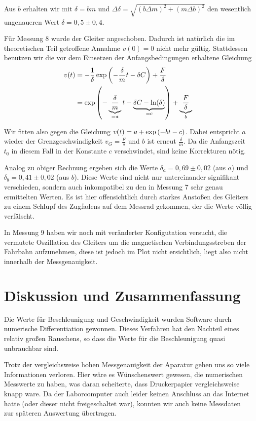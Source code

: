 \documentclass[a4paper,german,12pt,smallheadings]{scrartcl}
\begin{document}
Aus $b$ erhalten wir mit $\delta = b m$ und $\Delta \delta = \sqrt{(b \Delta
m)^2 + (m \Delta b)^2}$ den wesentlich ungenaueren Wert $\delta =
0{,}5\pm0{,}4$.

Für Messung 8 wurde der Gleiter angeschoben. Dadurch ist natürlich die im
theoretischen Teil getroffene Annahme $v(0) = 0$ nicht mehr gültig. Stattdessen
benutzen wir die vor dem Einsetzen der Anfangsbedingungen erhaltene Gleichung
\begin{align*}
  v(t) &= -\frac{1}{\delta} \exp \del{ - \frac{\delta}{m} t - \delta C} + \frac{F}{\delta} \\
       &= \exp \del{ - \underbrace{\frac{\delta}{m}}_{=a} t - \underbrace{\delta C - \ln(\delta)}_{=c}} + \underbrace{\frac{F}{\delta}}_{b} \\
\end{align*}

Wir fitten also gegen die Gleichung $v(t) = a + \exp\del{-bt-c}$. Dabei
entspricht $a$ wieder der Grenzgeschwindigkeit $v_G = \frac{F}{\delta}$ und $b$
ist erneut $\frac{\delta}{m}$. Da die Anfangszeit $t_0$ in diesem Fall in der
Konstante $c$ verschwindet, sind keine Korrekturen nötig.

Analog zu obiger Rechnung ergeben sich die Werte $\delta_a = 0{,}69 \pm 0{,}02$
(aus $a$) und $\delta_b = 0{,}41\pm0{,}02$ (aus $b$). Diese Werte sind nicht
nur untereinander signifikant verschieden, sondern auch inkompatibel zu den in
Messung 7 sehr genau ermittelten Werten. Es ist hier offensichtlich durch starkes
Anstoßen des Gleiters zu einem Schlupf des Zugfadens auf dem Messrad gekommen,
der die Werte völlig verfälscht.

In Messung 9 haben wir noch mit veränderter Konfigutation versucht, die
vermutete Oszillation des Gleiters um die magnetischen Verbindungsstreben der
Fahrbahn aufzunehmen, diese ist jedoch im Plot nicht ersichtlich, liegt also
nicht innerhalb der Messgenauigkeit.

\section*{Diskussion und Zusammenfassung}

Die Werte für Beschleunigung und Geschwindigkeit wurden Software durch
numerische Differentiation gewonnen. Dieses Verfahren hat den Nachteil eines
relativ großen Rauschens, so dass die Werte für die Beschleunigung quasi
unbrauchbar sind.

Trotz der vergleichsweise hohen Messgenauigkeit der Aparatur gehen uns so viele
Informationen verloren. Hier wäre es Wünschenswert gewesen, die numerischen
Messwerte zu haben, was daran scheiterte, dass Druckerpapier vergleichsweise
knapp ware. Da der Laborcomputer auch leider keinen Anschluss an das Internet
hatte (oder dieser nicht freigeschaltet war), konnten wir auch keine Messdaten
zur späteren Auswertung übertragen.
\end{document}
